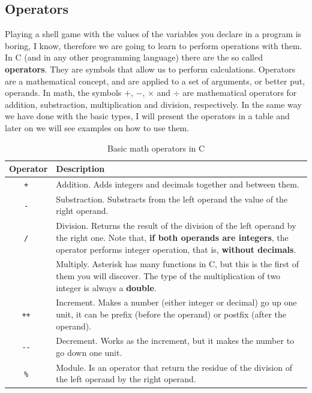 \documentclass[a4paper]{article}
\begin{document}
\subsection{Operators}
Playing a shell game with the values of the variables you declare in a program
is boring, I know, therefore we are going to learn to perform operations with
them. In C (and in any other programming language) there are the so called
\textbf{operators}. They are symbols that allow us to perform calculations.
Operators are a mathematical concept, and are applied to a set of arguments, or
better put, operands. In math, the symbols $+$, $-$, $\times$ and $\div$ are
mathematical operators for addition, substraction, multiplication and division,
respectively. In the same way we have done with the basic types, I will present
the operators in a table and later on we will see examples on how to use them.

\begin{table}[H]
\centering
\begin{tabularx}{\linewidth}{|c|Y|}
\hline
\bf Operator & \bf Description \\ \hline
\tt + & Addition. Adds integers and decimals together and between them. \\\hline
\tt - & Substraction. Substracts from the left operand the value of the right operand. \\\hline
\tt / & Division. Returns the result of the division of the left operand by the right one. Note that, \textbf{if both operands are integers}, the operator performs integer operation, that is, \textbf{without decimals}. \\\hline
\tt * & Multiply. Asterisk has many functions in C, but this is the first of them you will discover. The type of the multiplication of two integer is always a \textbf{double}.\\\hline
\tt ++ & Increment. Makes a number (either integer or decimal) go up one unit, it can be prefix (before the operand) or postfix (after the operand).\\\hline
\tt -{}- & Decrement. Works as the increment, but it makes the number to go down one unit. \\\hline
\tt \% & Module. Is an operator that return the residue of the division of the left operand by the right operand. \\\hline
\end{tabularx}
\caption{Basic math operators in C}
\label{tab:mathOperators}
\end{table}
\end{document}
